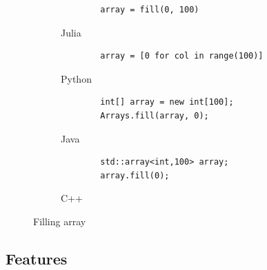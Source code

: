 \documentclass[a4paper, 11pt, titlepage]{article}
\begin{document}
\begin{figure}[H]
	\centering
	\begin{subfigure}[b]{0.7\textwidth}
		\centering
		\begin{lstlisting}
		array = fill(0, 100)
		\end{lstlisting}
		\caption{Julia}
	\end{subfigure}
	\begin{subfigure}[b]{0.7\textwidth}
		\centering
		\begin{lstlisting}
		array = [0 for col in range(100)]
		\end{lstlisting}
		\caption{Python}
	\end{subfigure}	
	\begin{subfigure}[b]{0.7\textwidth}
		\centering
		\begin{lstlisting}
		int[] array = new int[100];
		Arrays.fill(array, 0);
		\end{lstlisting}
		\caption{Java}
	\end{subfigure}
	\begin{subfigure}[b]{0.7\textwidth}
		\centering
		\begin{lstlisting}
		std::array<int,100> array;
		array.fill(0);
		\end{lstlisting}
		\caption{C++}
	\end{subfigure}
	\caption{Filling array}
	\label{Filling array with 0's}
\end{figure}

\subsection{Features}
\end{document}
